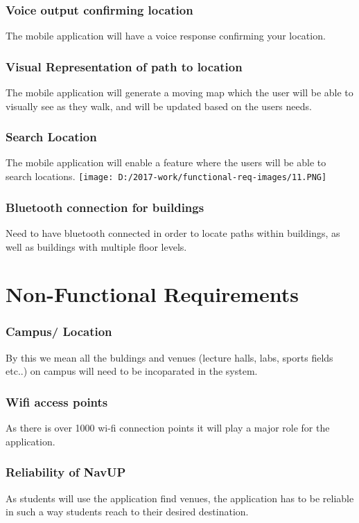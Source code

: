 \documentclass{article}
\begin{document}
\begin{center}
\subsubsection{Voice output confirming location}
The mobile application will have a voice response confirming your location.

\subsubsection{Visual Representation of path to location}
The mobile application will generate a moving map which the user will be able to visually see as they walk, and will be updated based on the users needs.
\newpage
\subsubsection{Search Location}
The mobile application will enable a feature where the users will be able to search locations.
\texttt{[image: D:/2017-work/functional-req-images/11.PNG]}

\newpage
\subsubsection{Bluetooth connection for buildings}
Need to have bluetooth connected in order to locate paths within buildings, as well as buildings with multiple floor levels.
\end{center}
\newpage
\centering
\section{Non-Functional Requirements}
 
\subsubsection{Campus/ Location}
By this we mean all the buldings and venues (lecture halls, labs, sports fields etc..) on campus will need to be incoparated in the system.
\subsubsection{Wifi access points}
As there is over 1000 wi-fi connection points it will play a major role for the application.
\subsubsection{Reliability of NavUP}
As students will use the application find venues, the application has to be reliable in such a way students reach to their desired destination.
\end{document}
